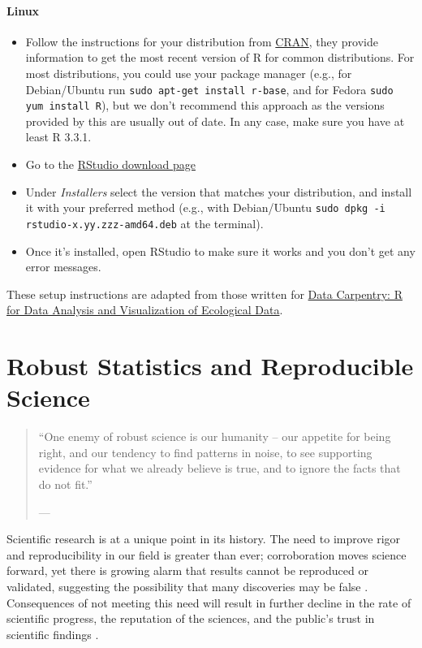 \documentclass[
  12pt, krantz2,
]{krantz}
\newcommand{\passthrough}[1]{#1}
\providecommand{\tightlist}{%
  \setlength{\itemsep}{0pt}\setlength{\parskip}{0pt}}
\theoremstyle{definition}
\theoremstyle{definition}
\theoremstyle{definition}
\newcommand{\1}{\mathbbm{1}}
\begin{document}
\hypertarget{linux}{%
\subsubsection{Linux}\label{linux}}

\begin{itemize}
\tightlist
\item
  Follow the instructions for your distribution
  from \href{https://cloud.r-project.org/bin/linux}{CRAN}, they provide information
  to get the most recent version of R for common distributions. For most
  distributions, you could use your package manager (e.g., for Debian/Ubuntu run
  \passthrough{\lstinline!sudo apt-get install r-base!}, and for Fedora \passthrough{\lstinline!sudo yum install R!}), but we
  don't recommend this approach as the versions provided by this are
  usually out of date. In any case, make sure you have at least R 3.3.1.
\item
  Go to the \href{https://www.rstudio.com/products/rstudio/download/\#download}{RStudio download
  page}
\item
  Under \emph{Installers} select the version that matches your distribution, and
  install it with your preferred method (e.g., with Debian/Ubuntu \passthrough{\lstinline!sudo dpkg -i rstudio-x.yy.zzz-amd64.deb!} at the terminal).
\item
  Once it's installed, open RStudio to make sure it works and you don't get any
  error messages.
\end{itemize}

These setup instructions are adapted from those written for \href{http://www.datacarpentry.org/R-ecology-lesson/}{Data Carpentry: R
for Data Analysis and Visualization of Ecological
Data}.

\hypertarget{robust}{%
\chapter{Robust Statistics and Reproducible Science}\label{robust}}

\begin{quote}
``One enemy of robust science is our humanity -- our appetite for
being right, and our tendency to find patterns in noise, to see supporting
evidence for what we already believe is true, and to ignore the facts that do
not fit.''

--- \citet{naturenews_2015}
\end{quote}

Scientific research is at a unique point in its history. The need to improve
rigor and reproducibility in our field is greater than ever; corroboration moves
science forward, yet there is growing alarm that results cannot be reproduced or
validated, suggesting the possibility that many discoveries may be false
\citep{baker2016there}. Consequences of not meeting this need will result in further
decline in the rate of scientific progress, the reputation of the sciences, and
the public's trust in scientific findings \citep{munafo2017manifesto, naturenews2_2015}.
\end{document}
